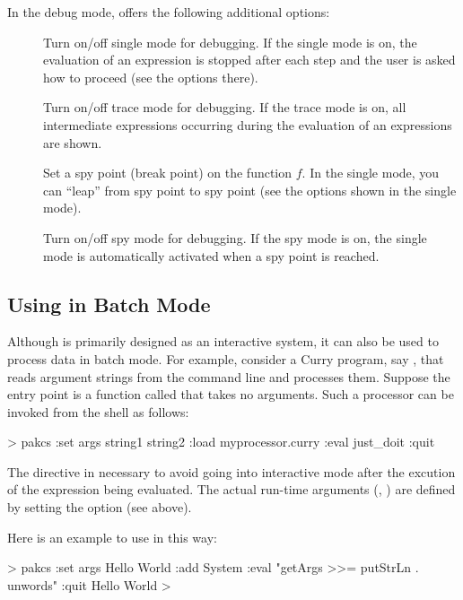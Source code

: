 In the debug mode, \CYS offers the following additional options:
%
\begin{description}
\item[]
Turn on/off single mode for debugging.
If the single mode is on, the evaluation of an expression
is stopped after each step and the user is asked how to proceed
(see the options there).

\item[]
Turn on/off trace mode for debugging.
If the trace mode is on, all intermediate expressions occurring
during the evaluation of an expressions are shown.

\item[]
Set a spy point (break point) on the
function $f$. In the single mode, you can ``leap'' from spy point
to spy point (see the options shown in the single mode).

\item[] Turn on/off spy mode for debugging.
If the spy mode is on, the single mode is automatically activated
when a spy point is reached.
\end{description}


\subsection{Using \CYS in Batch Mode}

Although \CYS is primarily designed as an interactive system,
it can also be used to process data in batch mode.
For example, consider a Curry program, say , that
reads argument strings from the command line and processes them.
Suppose the entry point is a function called 
that takes no arguments. Such a processor can be invoked from
the shell as follows:
\begin{curry}
> pakcs :set args string1 string2 :load myprocessor.curry :eval just_doit :quit
\end{curry}
The  directive in necessary to avoid \CYS going
into interactive mode after the
excution of the expression being evaluated.
The actual run-time arguments (, )
are defined by setting the option  (see above).

Here is an example to use \CYS in this way:
\begin{curry}
> pakcs :set args Hello World :add System :eval "getArgs >>= putStrLn . unwords" :quit
Hello World
>
\end{curry}


